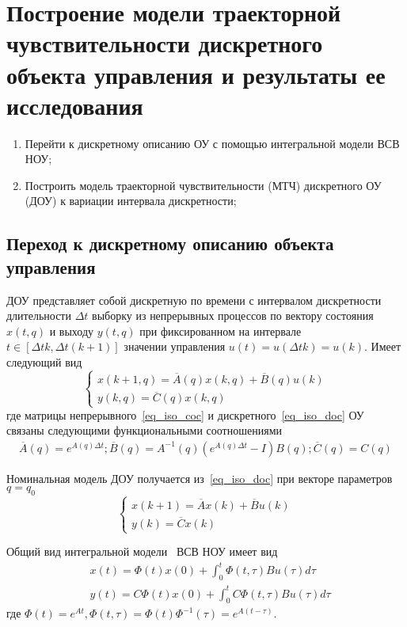 \section{Построение модели траекторной чувствительности дискретного объекта управления и результаты ее исследования}

\begin{enumerate}
	\item Перейти к дискретному описанию ОУ с помощью интегральной модели ВСВ НОУ;
	\item Построить модель траекторной чувствительности (МТЧ) дискретного ОУ (ДОУ) к вариации интервала дискретности;
\end{enumerate}


\subsection{Переход к дискретному описанию объекта управления}

ДОУ представляет собой дискретную по времени с интервалом дискретности
длительности $\Delta t$ выборку из непрерывных процессов по вектору
состояния $x(t,q)$ и выходу $y(t,q)$ при фиксированном на интервале $t \in \left[\Delta t k, \Delta t(k+1)\right]$ значении управления $u(t) = u(\Delta t k) = u(k)$. Имеет следующий вид
\begin{equation}\label{eq_iso_doc}
	\begin{cases}
		x(k+1, q) = \overline{A}(q) x(k, q) + \overline{B}(q) u(k)\\
		y(k, q) = \overline{C}(q) x(k, q)
	\end{cases}
\end{equation}
где матрицы непрерывного~\ref{eq_iso_coc} и дискретного~\ref{eq_iso_doc} ОУ связаны следующими функциональными соотношениями
\begin{align}
	\overline{A}(q) = e^{A(q) \Delta t}; \overline{B}(q) = A^{-1}(q)(e^{A(q) \Delta t} - I)B(q); \overline{C}(q) = C(q)
\end{align}


Номинальная модель ДОУ получается из~\ref{eq_iso_doc} при векторе параметров $q=q_0$
\begin{equation}\label{eq_iso_doc_n}
	\begin{cases}
		x(k+1) = \overline{A} x(k) + \overline{B} u(k)\\
		y(k) = \overline{C} x(k)
	\end{cases}
\end{equation}

Общий вид интегральной модели~\cite{MIROSH} ВСВ НОУ имеет вид
\begin{align}
	&x(t) = \Phi (t) x(0) + \int_0^t \Phi (t, \tau) B u(\tau) d \tau \\
	&y(t) = C \Phi (t) x(0) + \int_0^t C \Phi(t, \tau) B u(\tau) d \tau 
\end{align}
где $\Phi(t) = e^{At}, \Phi(t, \tau) = \Phi(t) \Phi^{-1}(\tau) = e^{A(t-\tau)}$.

